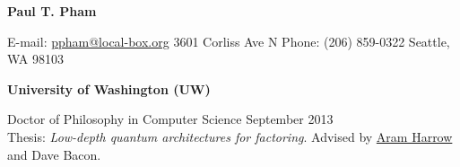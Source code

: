 \documentclass[letter]{article}
\begin{document}
\thispagestyle{firststyle} %

\reversemarginpar		%

{\LARGE {\bf Paul T. Pham}}
\par
\vspace{.25in}
E-mail: \href{mailto:ppham@local-box.org}{ppham@local-box.org}
\hspace*{\fill}
3601 Corliss Ave N
\linebreak
Phone: (206) 859-0322
\hspace*{\fill}
Seattle, WA 98103

\par
\vspace{.25in}



{\bf University of Washington (UW)}
\par
Doctor of Philosophy in Computer Science \hspace*{\fill}September 2013\\
Thesis: \emph{Low-depth quantum architectures for factoring}.
Advised by \href{http://www.cs.washington.edu/people/faculty/aram/}{Aram Harrow}
and Dave Bacon.
\vspace{\baselineskip}
\par
\end{document}

